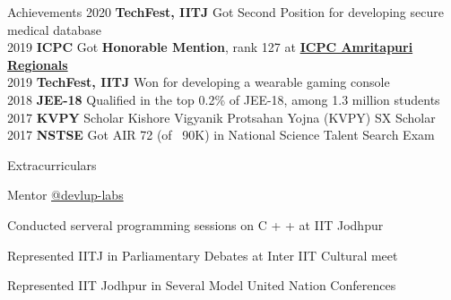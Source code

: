 \documentclass[]{deedy-resume-openfont}
\begin{document}
\begin{minipage}[t]{0.66\textwidth}



\begin{section}{Achievements}
2020 \textbf{TechFest, IITJ} Got Second Position for developing secure medical database\\
2019 \textbf{ICPC} Got \textbf{Honorable Mention}, rank 127 at \href{https://icpc.global/ICPCID/SV747893JYP7}{\textbf{ICPC Amritapuri Regionals \faExternalLink}}\\
2019 \textbf{TechFest, IITJ} Won for developing a wearable gaming console\\
2018 \textbf{JEE-18} Qualified in the top 0.2\% of JEE-18, among 1.3 million students\\
2017 \textbf{KVPY} Scholar Kishore Vigyanik Protsahan Yojna (KVPY) SX Scholar\\
2017 \textbf{NSTSE} Got AIR 72 (of ~90K) in National Science Talent Search Exam
\end{section}

\begin{section}{Extracurriculars}

\begin{tightemize}
\vspace{\topsep} %
\item Mentor \href{https://github.com/devlup-labs}{@devlup-labs \faExternalLink} \\
\item Conducted serveral programming sessions on C + + at IIT Jodhpur \\
\item Represented IITJ in Parliamentary Debates at Inter IIT Cultural meet \\
\item Represented IIT Jodhpur in Several Model United Nation Conferences \\
\end{tightemize}
\end{section}

\sectionsep



\end{minipage} 
\end{document}

